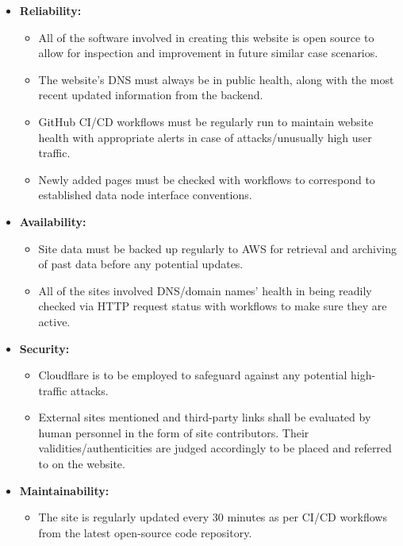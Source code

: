 \begin{itemize}
  \item \textbf{Reliability:}
    \begin{itemize}[label=$\blacksquare$]
      \item All of the software involved in creating this website is open source to allow for inspection and improvement in future similar case scenarios.
      \item The website's DNS must always be in public health, along with the most recent updated information from the backend.
      \item GitHub CI/CD workflows must be regularly run to maintain website health with appropriate alerts in case of attacks/unusually high user traffic.
      \item Newly added pages must be checked with workflows to correspond to established data node interface conventions.
    \end{itemize}
  
  \item \textbf{Availability:}
    \begin{itemize}[label=$\blacksquare$]
      \item Site data must be backed up regularly to AWS for retrieval and archiving of past data before any potential updates.
      \item All of the sites involved DNS/domain names' health in being readily checked via HTTP request status with workflows to make sure they are active.
    \end{itemize}
  
  \item \textbf{Security:}
    \begin{itemize}[label=$\blacksquare$]
      \item Cloudflare is to be employed to safeguard against any potential high-traffic attacks.
      \item External sites mentioned and third-party links shall be evaluated by human personnel in the form of site contributors. Their validities/authenticities are judged accordingly to be placed and referred to on the website.
    \end{itemize}
    
  \item \textbf{Maintainability:}
    \begin{itemize}[label=$\blacksquare$]
      \item The site is regularly updated every 30 minutes as per CI/CD workflows from the latest open-source code repository.
    \end{itemize}
  

\end{itemize}
